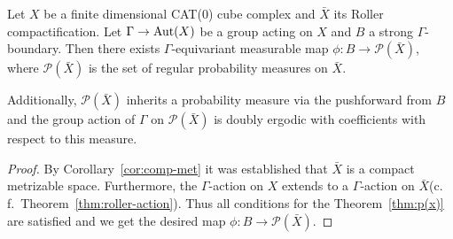 \begin{cor}
  \label{cor:p(x)}
  Let \(X\) be a finite dimensional CAT(0) cube complex and \(\bar X\) its Roller compactification. Let \(\Gamma \to \operatorname{Aut}(X)\) be a group acting on \(X\) and \(B\) a strong \(\Gamma\)-boundary. Then there exists \(\Gamma\)-equivariant measurable map \(\phi\colon B \to \mathcal{P}(\bar X)\), where \(\mathcal{P}(\bar X)\) is the set of regular probability measures on \(\bar X\).

  Additionally, \(\mathcal{P}(\bar X)\) inherits a probability measure via the pushforward from \(B\) and the group action of \(\Gamma\) on \(\mathcal{P}(\bar X)\) is doubly ergodic with coefficients with respect to this measure.
\end{cor}

\begin{proof}
  By Corollary~\ref{cor:comp-met} it was established that \(\bar X\) is a compact metrizable space. Furthermore, the \(\Gamma\)-action on \(X\) extends to a \(\Gamma\)-action on \(\bar X\)(c.\,f.\ Theorem~\ref{thm:roller-action}). Thus all conditions for the Theorem~\ref{thm:p(x)} are satisfied and we get the desired map \(\phi\colon B \to \mathcal{P}(\bar X)\).
\end{proof}

